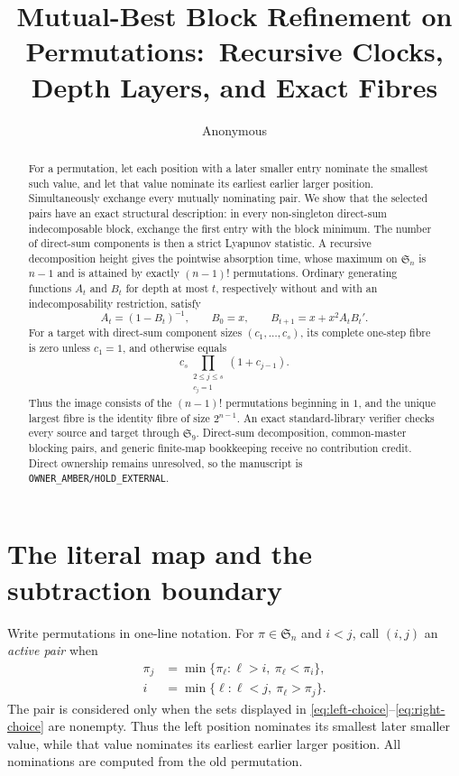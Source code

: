 \documentclass[a4paper,10pt]{amsart}
\title[Mutual-best block refinement]{Mutual-Best Block Refinement on
Permutations:\ Recursive Clocks, Depth Layers, and Exact Fibres}
\author{Anonymous}
\date{}
\theoremstyle{definition}
\theoremstyle{remark}
\newcommand{\Sn}{\mathfrak S_n}
\begin{document}
\begin{abstract}
For a permutation, let each position with a later smaller entry nominate the
smallest such value, and let that value nominate its earliest earlier larger
position.  Simultaneously exchange every mutually nominating pair.  We show
that the selected pairs have an exact structural description: in every
non-singleton direct-sum indecomposable block, exchange the first entry with
the block minimum.  The number of direct-sum components is then a strict
Lyapunov statistic.  A recursive decomposition height gives the pointwise
absorption time, whose maximum on $\mathfrak S_n$ is $n-1$ and is attained by
exactly $(n-1)!$ permutations.  Ordinary generating functions $A_t$ and
$B_t$ for depth at most $t$, respectively without and with an
indecomposability restriction, satisfy
\[
 A_t=(1-B_t)^{-1},\qquad B_0=x,\qquad
 B_{t+1}=x+x^2A_tB_t'.
\]
For a target with direct-sum component sizes $(c_1,\ldots,c_s)$, its complete
one-step fibre is zero unless $c_1=1$, and otherwise equals
\[
 c_s\prod_{\substack{2\le j\le s\\c_j=1}}(1+c_{j-1}).
\]
Thus the image consists of the $(n-1)!$ permutations beginning in $1$, and
the unique largest fibre is the identity fibre of size $2^{n-1}$.  An exact
standard-library verifier checks every source and target through
$\mathfrak S_9$.  Direct-sum decomposition, common-master blocking pairs,
and generic finite-map bookkeeping receive no contribution credit.  Direct
ownership remains unresolved, so the manuscript is
\texttt{OWNER\_AMBER/HOLD\_EXTERNAL}.
\end{abstract}

\maketitle

\section{The literal map and the subtraction boundary}

Write permutations in one-line notation.  For $\pi\in\Sn$ and $i<j$, call
$(i,j)$ an \emph{active pair} when
\begin{align}
 \pi_j&=\min\{\pi_\ell:\ell>i,\ \pi_\ell<\pi_i\},
 \label{eq:left-choice}\\
 i&=\min\{\ell:\ell<j,\ \pi_\ell>\pi_j\}.
 \label{eq:right-choice}
\end{align}
The pair is considered only when the sets displayed in
\eqref{eq:left-choice}--\eqref{eq:right-choice} are nonempty.  Thus the left
position nominates its smallest later smaller value, while that value
nominates its earliest earlier larger position.  All nominations are
computed from the old permutation.
\end{document}
